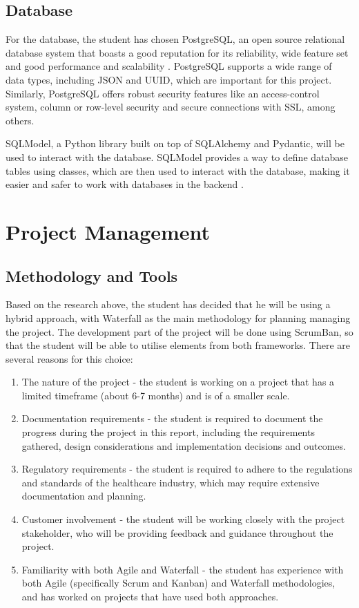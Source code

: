 \FloatBarrier

\subsection{Database}

For the database, the student has chosen PostgreSQL, an open source relational database system that boasts a good reputation for its reliability, wide feature set and good performance and scalability \parencite{postgres}. PostgreSQL supports a wide range of data types, including JSON and UUID, which are important for this project. Similarly, PostgreSQL offers robust security features like an access-control system, column or row-level security and secure connections with SSL, among others. 

SQLModel, a Python library built on top of SQLAlchemy and Pydantic, will be used to interact with the database. SQLModel provides a way to define database tables using classes, which are then used to interact with the database, making it easier and safer to work with databases in the backend \parencite{sqlmodel}.

\section{Project Management}

\subsection{Methodology and Tools}

Based on the research above, the student has decided that he will be using a hybrid approach, with Waterfall as the main methodology for planning managing the project. The development part of the project will be done using ScrumBan, so that the student will be able to utilise elements from both frameworks. There are several reasons for this choice:

\begin{enumerate}
    \item The nature of the project - the student is working on a project that has a limited timeframe (about 6-7 months) and is of a smaller scale. 
    \item Documentation requirements - the student is required to document the progress during the project in this report, including the requirements gathered, design considerations and implementation decisions and outcomes. 
    \item Regulatory requirements - the student is required to adhere to the regulations and standards of the healthcare industry, which may require extensive documentation and planning.
    \item Customer involvement - the student will be working closely with the project stakeholder, who will be providing feedback and guidance throughout the project.
    \item Familiarity with both Agile and Waterfall - the student has experience with both Agile (specifically Scrum and Kanban) and Waterfall methodologies, and has worked on projects that have used both approaches.
\end{enumerate}

